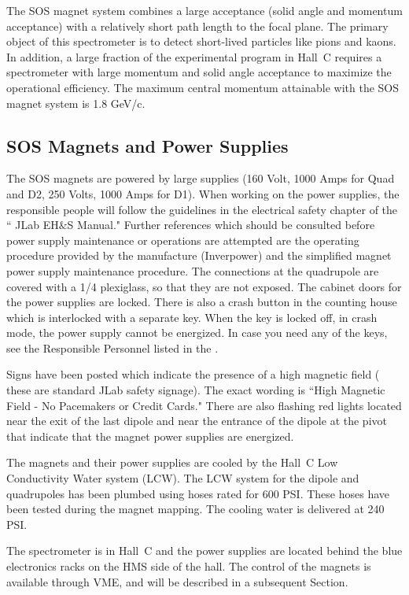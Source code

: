 The SOS magnet system combines a large acceptance (solid angle and momentum
acceptance) with a relatively short path length to the focal plane.
The primary object of this spectrometer is to detect short-lived particles
like pions and kaons. In addition, a large fraction of the experimental
program in Hall~C requires a spectrometer with large momentum and solid angle
acceptance to maximize the operational efficiency.
The maximum central momentum attainable with the SOS magnet system is 1.8 GeV/c.

\subsection{SOS Magnets and Power Supplies }

The SOS magnets are powered by large supplies
(160 Volt, 1000 Amps for Quad and D2, 250 Volts, 1000 Amps for D1).
When working on the power supplies, the responsible people will follow
the guidelines in the electrical safety chapter of the `` JLab EH$\&$S
Manual." Further references which should be consulted before power supply
maintenance or operations are attempted are the operating procedure
provided by the manufacture (Inverpower) and the simplified magnet
power supply maintenance procedure.
The connections at the quadrupole are covered with a 1/4 plexiglass, so that they are not exposed.
The cabinet doors for the power supplies are locked.
There is also a crash button in the counting house which is interlocked with
a separate key. When the key is locked off, in crash mode, the power supply
cannot be energized.
In case you need any of the keys, see the Responsible Personnel listed in 
the .

Signs have been posted which indicate the presence of a high magnetic
field ( these are standard JLab safety signage). The exact wording is
``High Magnetic Field - No Pacemakers or Credit Cards." There
are also flashing red lights located near the exit of the last dipole
and near the entrance of the dipole at the pivot that indicate that the
magnet power supplies are energized.

The magnets and their power supplies
are cooled by the Hall~C Low Conductivity Water system (LCW).
The LCW system for the dipole and quadrupoles has been
plumbed using hoses rated for 600 PSI. These hoses have been tested during
the magnet mapping. The cooling water is delivered at 240 PSI.

The spectrometer is in Hall~C and the power supplies are located
behind the blue electronics racks on the HMS side of the hall.
The control of the magnets is available through VME, and will be
described in a subsequent Section.


